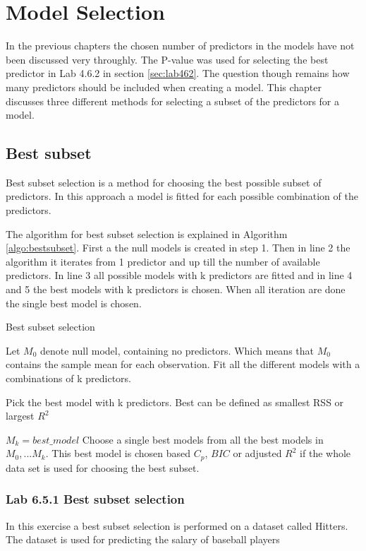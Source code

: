 \chapter{Model Selection}
\label{chp:subsel}

In the previous chapters the chosen number of predictors in the models have not been discussed very throughly. The P-value was used for selecting the best predictor in Lab 4.6.2 in section \ref{sec:lab462}. The question though remains how many predictors should be included when creating a model. This chapter discusses three different methods for selecting a subset of the predictors for a model.

\section{Best subset}
Best subset selection is a method for choosing the best possible subset of predictors. In this approach a model is fitted for each possible combination of the predictors.

The algorithm for best subset selection is explained in Algorithm \ref{algo:bestsubset}. First a the null models is created in step 1. Then in line 2 the algorithm it iterates from 1 predictor and up till the number of available predictors. In line 3 all possible models with k predictors are fitted and in line 4 and 5 the best models with k predictors is chosen. When all iteration are done the single best model is chosen.

\begin{algorithm}
	\caption{Best subset selection}
	\label{algo:bestsubset}
	\begin{algorithmic}[1]
		\State Let $M_0$ denote null model, containing no predictors. Which means that $M_0$ contains the sample mean for each observation.
		\State Fit all the different models with a combinations of k predictors.
		\State \parbox[t]{\dimexpr\linewidth-\algorithmicindent}{Pick the best model with k predictors. Best can be defined as smallest RSS or largest $R^2$}
		\State $M_k = best\_model$
		\EndFor
		\State Choose a single best models from all the best models in $M_0,...M_k$. This best model is chosen based $C_p$, $BIC$ or adjusted $R^2$ if the whole data set is used for choosing the best subset.
	\end{algorithmic}
\end{algorithm}


\subsection{Lab 6.5.1 Best subset selection}
In this exercise a best subset selection is performed on a dataset called Hitters. The dataset is used for predicting the salary of baseball players

